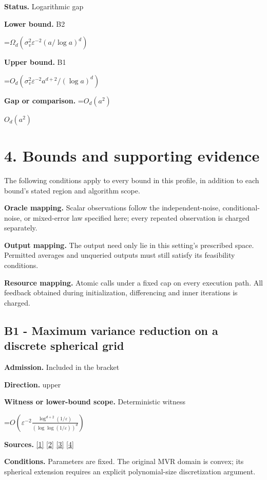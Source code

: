 \documentclass[10pt,a4paper]{article}
\newcommand{\AtlasMath}[1]{\par\begingroup\centering\setbox0=\hbox{$\displaystyle #1$}\ifdim\wd0>1.4\linewidth\typeout{ATLAS WIDE FORMULA: \the\wd0}\fi\ifdim\wd0>\linewidth\resizebox{\linewidth}{!}{\box0}\else\box0\fi\par\endgroup}
\newcommand{\AtlasInlineMath}[1]{\begingroup\setbox0=\hbox{$#1$}\ifdim\wd0>.4\linewidth\endgroup\AtlasMath{#1}\else\endgroup$#1$\fi}
\begin{document}
\textbf{Status.} Logarithmic gap

\textbf{Lower bound.} B2

\AtlasMath{\Omega_d(\sigma_v^2\varepsilon^{-2}(a/\log a)^d)}
\textbf{Upper bound.} B1

\AtlasMath{O_d(\sigma_v^2\varepsilon^{-2}a^{d+2}/(\log a)^d)}
\textbf{Gap or comparison.} \AtlasInlineMath{O_d(a^2)}

\section{4. Bounds and supporting evidence}
The following conditions apply to every bound in this profile, in addition to each bound's stated region and algorithm scope.

\textbf{Oracle mapping.} Scalar observations follow the independent-noise, conditional-noise, or mixed-error law specified here; every repeated observation is charged separately.

\textbf{Output mapping.} The output need only lie in this setting's prescribed space. Permitted averages and unqueried outputs must still satisfy its feasibility conditions.

\textbf{Resource mapping.} Atomic calls under a fixed cap on every execution path. All feedback obtained during initialization, differencing and inner iterations is charged.

\subsection{B1 - Maximum variance reduction on a discrete spherical grid}
\textbf{Admission.} Included in the bracket

\textbf{Direction.} upper

\textbf{Witness or lower-bound scope.} Deterministic witness

\AtlasMath{O\!\left(\varepsilon^{-2}\frac{\log^{d+2}(1/\varepsilon)}{(\log\log(1/\varepsilon))^d}\right)}
\textbf{Sources.} \href{https://arxiv.org/html/2602.17940v1}{[1]} \href{https://proceedings.neurips.cc/paper/2021/file/b1300291698eadedb559786c809cc592-Paper.pdf}{[2]} \href{https://arxiv.org/html/2502.06363v1}{[3]} \href{https://arxiv.org/html/2607.29245v2}{[4]}

\textbf{Conditions.} Parameters are fixed. The original MVR domain is convex; its spherical extension requires an explicit polynomial-size discretization argument.
\end{document}
